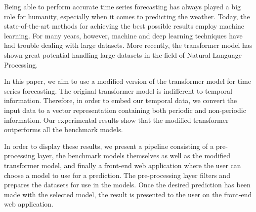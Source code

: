 Being able to perform accurate time series forecasting has always played a big role for humanity, especially when it comes to predicting the weather. 
Today, the state-of-the-art methods for achieving the best possible results employ machine learning. 
For many years, however, machine and deep learning techniques have had trouble dealing with large datasets. 
More recently, the transformer model has shown great potential handling large datasets in the field of Natural Language Processing.

In this paper, we aim to use a modified version of the transformer model for time series forecasting. 
The original transformer model is indifferent to temporal information. 
Therefore, in order to embed our temporal data, we convert the input data to a vector representation containing both periodic and non-periodic information.
Our experimental results show that the modified transformer outperforms all the benchmark models.

In order to display these results, we present a pipeline consisting of a pre-processing layer, the benchmark models themselves as well as the modified transformer model, and finally a front-end web application where the user can choose a model to use for a prediction.
The pre-processing layer filters and prepares the datasets for use in the models.
Once the desired prediction has been made with the selected model, the result is presented to the user on the front-end web application.
